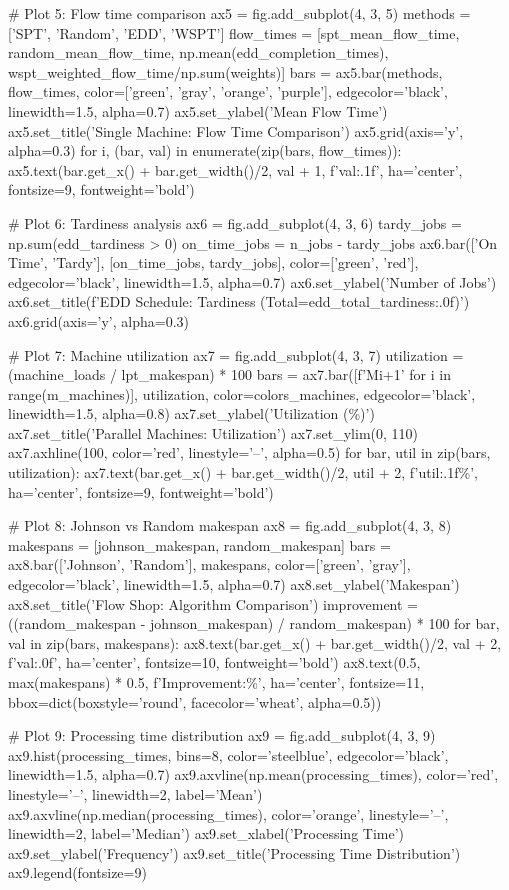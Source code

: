\documentclass[a4paper, 11pt]{article}
\begin{document}
\begin{pycode}
# Plot 5: Flow time comparison
ax5 = fig.add_subplot(4, 3, 5)
methods = ['SPT', 'Random', 'EDD', 'WSPT']
flow_times = [spt_mean_flow_time, random_mean_flow_time,
              np.mean(edd_completion_times), wspt_weighted_flow_time/np.sum(weights)]
bars = ax5.bar(methods, flow_times, color=['green', 'gray', 'orange', 'purple'],
               edgecolor='black', linewidth=1.5, alpha=0.7)
ax5.set_ylabel('Mean Flow Time')
ax5.set_title('Single Machine: Flow Time Comparison')
ax5.grid(axis='y', alpha=0.3)
for i, (bar, val) in enumerate(zip(bars, flow_times)):
    ax5.text(bar.get_x() + bar.get_width()/2, val + 1, f'{val:.1f}',
            ha='center', fontsize=9, fontweight='bold')

# Plot 6: Tardiness analysis
ax6 = fig.add_subplot(4, 3, 6)
tardy_jobs = np.sum(edd_tardiness > 0)
on_time_jobs = n_jobs - tardy_jobs
ax6.bar(['On Time', 'Tardy'], [on_time_jobs, tardy_jobs],
       color=['green', 'red'], edgecolor='black', linewidth=1.5, alpha=0.7)
ax6.set_ylabel('Number of Jobs')
ax6.set_title(f'EDD Schedule: Tardiness (Total={edd_total_tardiness:.0f})')
ax6.grid(axis='y', alpha=0.3)

# Plot 7: Machine utilization
ax7 = fig.add_subplot(4, 3, 7)
utilization = (machine_loads / lpt_makespan) * 100
bars = ax7.bar([f'M{i+1}' for i in range(m_machines)], utilization,
               color=colors_machines, edgecolor='black', linewidth=1.5, alpha=0.8)
ax7.set_ylabel('Utilization (\%)')
ax7.set_title('Parallel Machines: Utilization')
ax7.set_ylim(0, 110)
ax7.axhline(100, color='red', linestyle='--', alpha=0.5)
for bar, util in zip(bars, utilization):
    ax7.text(bar.get_x() + bar.get_width()/2, util + 2, f'{util:.1f}\%',
            ha='center', fontsize=9, fontweight='bold')

# Plot 8: Johnson vs Random makespan
ax8 = fig.add_subplot(4, 3, 8)
makespans = [johnson_makespan, random_makespan]
bars = ax8.bar(['Johnson', 'Random'], makespans, color=['green', 'gray'],
               edgecolor='black', linewidth=1.5, alpha=0.7)
ax8.set_ylabel('Makespan')
ax8.set_title('Flow Shop: Algorithm Comparison')
improvement = ((random_makespan - johnson_makespan) / random_makespan) * 100
for bar, val in zip(bars, makespans):
    ax8.text(bar.get_x() + bar.get_width()/2, val + 2, f'{val:.0f}',
            ha='center', fontsize=10, fontweight='bold')
ax8.text(0.5, max(makespans) * 0.5, f'Improvement:\%',
        ha='center', fontsize=11, bbox=dict(boxstyle='round', facecolor='wheat', alpha=0.5))

# Plot 9: Processing time distribution
ax9 = fig.add_subplot(4, 3, 9)
ax9.hist(processing_times, bins=8, color='steelblue', edgecolor='black', linewidth=1.5, alpha=0.7)
ax9.axvline(np.mean(processing_times), color='red', linestyle='--', linewidth=2, label='Mean')
ax9.axvline(np.median(processing_times), color='orange', linestyle='--', linewidth=2, label='Median')
ax9.set_xlabel('Processing Time')
ax9.set_ylabel('Frequency')
ax9.set_title('Processing Time Distribution')
ax9.legend(fontsize=9)


\end{pycode}
\end{document}
